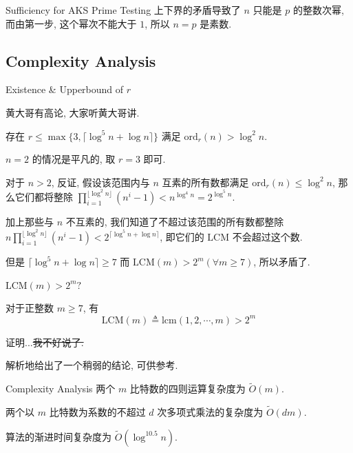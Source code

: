 \documentclass{beamer}
\def\le{\leqslant}
\def\ge{\geqslant}
\def\ord{\textrm{ord}}
\begin{document}
\begin{frame}{Sufficiency for AKS Prime Testing}
	上下界的矛盾导致了 $n$ 只能是 $p$ 的整数次幂, 而由第一步, 这个幂次不能大于 $1$, 所以 $n = p$ 是素数.
\end{frame}
\subsection{Complexity Analysis}
\begin{frame}{Existence \& Upperbound of $r$}
	\begin{center}
		{\kaishu 黄大哥有高论, 大家听黄大哥讲.}	
	\end{center}
	\pause 
	\begin{lemma}[弱一点的]
		存在 $r \le \max\{3, \lceil \log^5n + \log n \rceil\}$ 满足 $\ord_r(n) > \log^2n$.
	\end{lemma}

	$n = 2$ 的情况是平凡的, 取 $r = 3$ 即可.

	对于 $n > 2$, 反证, 假设该范围内与 $n$ 互素的所有数都满足 $\ord_r(n) \le \log^2n$, 那么它们都将整除 $\prod\limits_{i=1}^{\lfloor\log^2n\rfloor}(n^i-1) < n^{\log^4n} = 2^{\log^5n}$.

	加上那些与 $n$ 不互素的, 我们知道了不超过该范围的所有数都整除 $n\prod\limits_{i=1}^{\lfloor\log^2n\rfloor}(n^i-1) < 2^{\lceil\log^5n+\log n \rceil}$,  即它们的 $\textrm{LCM}$ 不会超过这个数.

	但是 $\lceil \log^5n + \log n \rceil \ge 7$ 而 $\textrm{LCM}(m) > 2^m (\forall m \ge 7)$, 所以矛盾了.
\end{frame}
\begin{frame}{$\textrm{LCM}(m) > 2^m ?$}
	\begin{lemma}
		对于正整数 $m \ge 7$, 有$$\textrm{LCM}(m) \triangleq \textrm{lcm}(1, 2, \cdots, m) > 2^m$$
	\end{lemma}

	证明...\sout{我不好说了.}

	\cite{farhi2009identity} 解析地给出了一个稍弱的结论, 可供参考.
\end{frame}
\begin{frame}{Complexity Analysis}
	两个 $m$ 比特数的四则运算复杂度为 $\tilde O(m)$.

	两个以 $m$ 比特数为系数的不超过 $d$ 次多项式乘法的复杂度为 $\tilde O(dm)$.

	\begin{theorem}
		算法的渐进时间复杂度为 $\tilde O(\log^{10.5}n)$.
	\end{theorem}
\end{frame}
\end{document}
